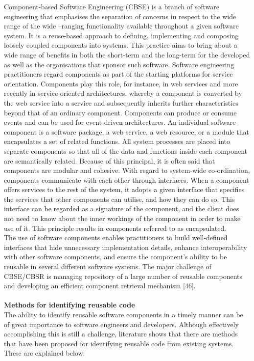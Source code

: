 \documentclass[a4paper]{article}
\begin{document}
Component-based Software Engineering (CBSE) is a branch of software engineering that emphasises the separation of concerns in respect to the wide range of the wide –ranging functionality available throughout a given software system. It is a reuse-based approach to defining, implementing and composing loosely coupled components into systems. This practice aims to bring about a wide range of benefits in both the short-term and the long-term for the developed as well as the organisations that sponsor such software. Software engineering practitioners regard components as part of the starting platforms for service orientation. Components play this role, for instance, in web services and more recently in service-oriented architectures, whereby a component is converted by the web service into a service and subsequently inherits further characteristics beyond that of an ordinary component. Components can produce or consume events and can be used for event-driven architectures. An individual software component is a software package, a web service, a web resource, or a module that encapsulates a set of related functions. All system processes are placed into separate components so that all of the data and functions inside each component are semantically related. Because of this principal, it is often said that components are modular and cohesive. With regard to system-wide co-ordination, components communicate with each other through interfaces. When a component offers services to the rest of the system, it adopts a given interface that specifies the services that other components can utilise, and how they can do so. This interface can be regarded as a signature of the component, and the client does not need to know about the inner workings of the component in order to make use of it. This principle results in components referred to as encapsulated. \\
The use of software components enables practitioners to build well-defined interfaces that hide unnecessary implementation details, enhance interoperability with other software components, and ensure the component's ability to be reusable in several different software systems. The major challenge of CBSE/CBSR is managing repository of  a  large  number  of  reusable components  and  developing an  efficient component retrieval mechanism [46]. 
\\ \\
{\bf Methods for identifying reusable code} \\
The ability to identify reusable software components in a timely manner can be of great importance to software engineers and developers. Although effectively accomplishing this is still a challenge, literature shows that there are methods that have been proposed for identifying reusable code from existing systems. These are explained below:\\ \\
\end{document}
